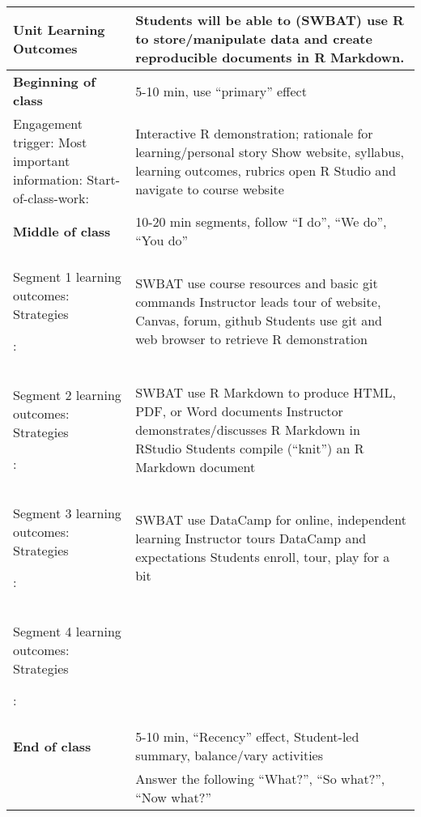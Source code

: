 \documentclass[letterpaper,11pt]{article}
\newcommand\Bshort{\rule[-5ex]{0pt}{0pt}} %
\newcommand\B{\rule[-10ex]{0pt}{0pt}} %
\begin{document}
\begin{tabular}{|p{0.3\linewidth} | p{0.7\linewidth}|}
  \hline
  \textbf{Unit Learning Outcomes} & Students will be able to (SWBAT) use R to store/manipulate data and create reproducible documents in R Markdown. \\
  \hline
  \textbf{Beginning of class} & 5-10 min, use ``primary'' effect
  \\
  \hline
  Engagement trigger: 
  \newline Most important information: 
  \newline Start-of-class-work:
                                  & Interactive R demonstration; rationale for learning/personal story
                                    \newline Show website, syllabus, learning outcomes, rubrics
                                    \newline open R Studio and navigate to course website
  \\
  \hline
  \textbf{Middle of class} & 10-20 min segments, follow ``I do'', ``We do'', ``You do''
  \\
  \hline
  Segment 1 learning outcomes: 
  \newline Strategies \B:

                                  & SWBAT use course resources and basic git commands
                                    \newline Instructor leads tour of website, Canvas, forum, github
                                    \newline Students use git and web browser to retrieve R demonstration
  \\
  Segment 2 learning outcomes: 
  \newline Strategies \B:
                                  & SWBAT use R Markdown to produce HTML, PDF, or Word documents
                                    \newline Instructor demonstrates/discusses R Markdown in RStudio
                                    \newline Students compile (``knit'') an R Markdown document
  \\
  Segment 3 learning outcomes: 
  \newline Strategies \B:
                                  & SWBAT use DataCamp for online, independent learning
                                    \newline Instructor tours DataCamp and expectations
                                    \newline Students enroll, tour, play for a bit
  \\
  Segment 4 learning outcomes:
  \newline Strategies \B:
                                  &
  \\
  \hline
  \textbf{End of class} & 5-10 min, ``Recency'' effect, Student-led summary, balance/vary activities \\
  \hline
  \Bshort
                                  & Answer the following ``What?'', ``So what?'', ``Now what?''
  \\
  \hline
\end{tabular}
\end{document}
